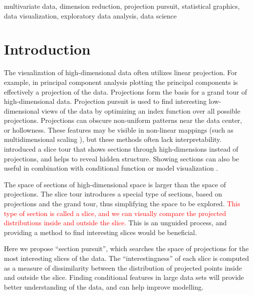 \documentclass[]{interact}
\theoremstyle{plain}%
\theoremstyle{definition}
\theoremstyle{remark}
\begin{document}
\begin{keywords}
multivariate data, dimension reduction, projection pursuit, statistical
graphics, data visualization, exploratory data analysis, data science
\end{keywords}

\hypersetup{linkcolor=black}
  \tableofcontents

\newpage

\hypertarget{introduction}{%
\section{Introduction}\label{introduction}}

The visualization of high-dimensional data often utilizes linear
projection. For example, in principal component analysis plotting the
principal components is effectively a projection of the data.
Projections form the basis for a grand tour \citep{As85} of
high-dimensional data. Projection pursuit \citep[\citet{FT74}]{kr69} is
used to find interesting low-dimensional views of the data by optimizing
an index function over all possible projections. Projections can obscure
non-uniform patterns near the data center, or hollowness. These features
may be visible in non-linear mappings (such as multidimensional scaling
\citep{mds}), but these methods often lack interpretability.
\citet{laa2019slice} introduced a slice tour that shows sections through
high-dimensions instead of projections, and helps to reveal hidden
structure. Showing sections can also be useful in combination with
conditional function or model visualization
\citep[\citet{sliceplorer}]{JSSv081i05}.

The space of sections of high-dimensional space is larger than the space
of projections. The slice tour \citep{laa2019slice} introduces a special
type of sections, based on projections and the grand tour, thus
simplifying the space to be explored.
\textcolor{red}{This type of section is called a slice, and we can visually compare the projected distributions inside and outside the slice.}
This is an unguided process, and providing a method to find interesting
slices would be beneficial.

Here we propose ``section pursuit'', which searches the space of
projections for the most interesting slices of the data. The
``interestingness'' of each slice is computed as a measure of
dissimilarity between the distribution of projected points inside and
outside the slice. Finding conditional features in large data sets will
provide better understanding of the data, and can help improve
modelling.
\end{document}
